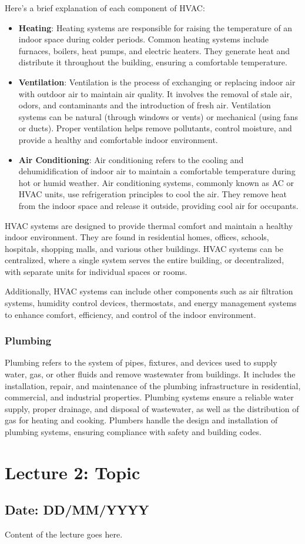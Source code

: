 \documentclass{article}
\begin{document}
Here's a brief explanation of each component of HVAC:
\begin{itemize}
  \item \textbf{Heating}: Heating systems are responsible for raising the temperature of an indoor space during colder periods. Common heating systems include furnaces, boilers, heat pumps, and electric heaters. They generate heat and distribute it throughout the building, ensuring a comfortable temperature.
  \item \textbf{Ventilation}: Ventilation is the process of exchanging or replacing indoor air with outdoor air to maintain air quality. It involves the removal of stale air, odors, and contaminants and the introduction of fresh air. Ventilation systems can be natural (through windows or vents) or mechanical (using fans or ducts). Proper ventilation helps remove pollutants, control moisture, and provide a healthy and comfortable indoor environment.
  \item \textbf{Air Conditioning}: Air conditioning refers to the cooling and dehumidification of indoor air to maintain a comfortable temperature during hot or humid weather. Air conditioning systems, commonly known as AC or HVAC units, use refrigeration principles to cool the air. They remove heat from the indoor space and release it outside, providing cool air for occupants.

\end{itemize}

HVAC systems are designed to provide thermal comfort and maintain a healthy indoor environment. They are found in residential homes, offices, schools, hospitals, shopping malls, and various other buildings. HVAC systems can be centralized, where a single system serves the entire building, or decentralized, with separate units for individual spaces or rooms.

Additionally, HVAC systems can include other components such as air filtration systems, humidity control devices, thermostats, and energy management systems to enhance comfort, efficiency, and control of the indoor environment.

\subsubsection*{Plumbing}
Plumbing refers to the system of pipes, fixtures, and devices used to supply water, gas, or other fluids and remove wastewater from buildings. It includes the installation, repair, and maintenance of the plumbing infrastructure in residential, commercial, and industrial properties. Plumbing systems ensure a reliable water supply, proper drainage, and disposal of wastewater, as well as the distribution of gas for heating and cooking. Plumbers handle the design and installation of plumbing systems, ensuring compliance with safety and building codes.

\newpage

\section{Lecture 2: Topic}
\subsection*{Date: DD/MM/YYYY}

Content of the lecture goes here.
\end{document}
